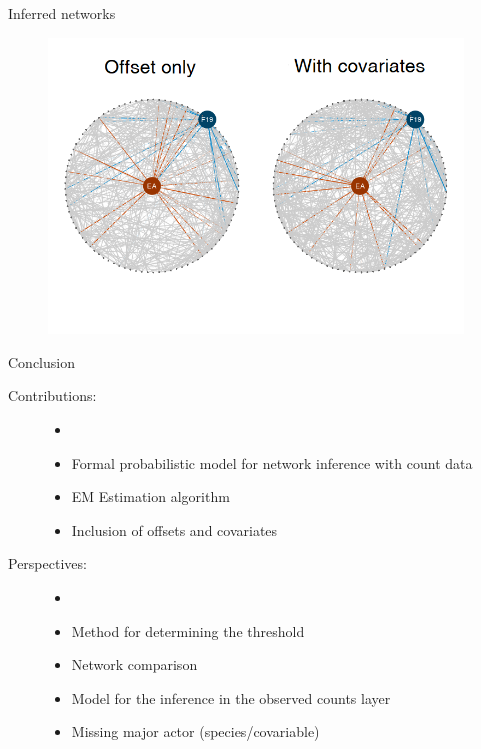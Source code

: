 \documentclass[aspectratio=169]{beamer}
\newcommand{\emphase}[1]{\textcolor{Complement}{#1}}
\begin{document}
\begin{frame}{Inferred networks}
\begin{figure}[htp]
\centering
\includegraphics[width=11cm]{compare_reseaux.png}

\end{figure}

\end{frame}
\begin{frame}{Conclusion}
\begin{description}
\item[Contributions:] 
\begin{itemize}
\item[]  
	\item Formal probabilistic model for network inference with \emphase{count data}
	\item  EM Estimation algorithm
	\item Inclusion of \emphase{offsets} and \emphase{covariates}
\end{itemize}
\bigskip 
\item[Perspectives:]

\begin{itemize}
\item[]  
	\item Method for determining the threshold
	\item Network comparison
	\item Model for the inference in the observed counts layer
	\item Missing major actor (species/covariable)
\end{itemize}
\end{description}
\end{frame}
\end{document}
